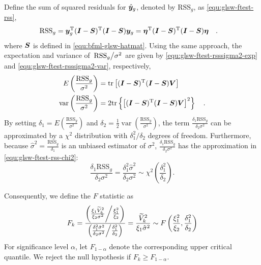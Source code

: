 \documentclass[times]{interact}
\theoremstyle{plain}%
\theoremstyle{definition}
\theoremstyle{remark}
\begin{document}
Define the sum of squared residuals for $\hat{\bm{y}}_g$, denoted by $\mathrm{RSS}_g$, as \autoref{equ:glsw-ftest-rss},
\begin{equation}\label{equ:glsw-ftest-rss}
    \begin{split}
    \mathrm{RSS}_{g} & = \bm{y}_{g}^{\mathrm{T}}(\bm{I}-\bm{S})^{\mathrm{T}}(\bm{I}-\bm{S})\bm{y}_{g} = \bm{\eta}^{\mathrm{T}}(\bm{I}-\bm{S})^{\mathrm{T}}(\bm{I}-\bm{S})\bm{\eta} \quad .
    \end{split}
\end{equation}
where $\bm{S}$ is defined in \autoref{equ:bfml-glsw-hatmat}.
Using the same approach, the expectation and variance of $\left.\mathrm{RSS}_g\middle/\sigma^2\right.$ are given by \autoref{equ:glsw-ftest-rsssigma2-exp} and \autoref{equ:glsw-ftest-rsssigma2-var}, respectively,
\begin{align}
\label{equ:glsw-ftest-rsssigma2-exp}
E\left( \frac{\mathrm{RSS}_{g}}{\sigma^{2}} \right) & = \mathrm{tr}\left[ (\bm{I}-\bm{S})^{\mathrm{T}}(\bm{I}-\bm{S})\bm{V} \right]  \\
\label{equ:glsw-ftest-rsssigma2-var}
\mathop{\mathrm{var}}\left( \frac{\mathrm{RSS}_{g}}{\sigma^{2}} \right) & = 2\mathrm{tr}\left\{ \left[ (\bm{I}-\bm{S})^{\mathrm{T}}(\bm{I}-\bm{S})\bm{V} \right]^2 \right\} \quad .
\end{align}
By setting $\delta_{1}=E\left( \frac{\mathrm{RSS}_{g}}{\sigma^{2}} \right)$ and 
$\delta_{2}=\frac{1}{2}\mathop{\mathrm{var}}\left( \frac{\mathrm{RSS}_{g}}{\sigma^{2}} \right)$,
the term $\frac{\delta_1\mathrm{RSS}_g}{\delta_2\sigma^2}$ can be approximated by a $\chi^2$ distribution with $\delta_1^2/\delta_2$ degrees of freedom.
Furthermore, because $\hat{\sigma}^2 = \frac{\mathrm{RSS}_g}{\delta_1}$
is an unbiased estimator of $\sigma^2$, $\frac{\delta_1\mathrm{RSS}_g}{\delta_2\sigma^2}$ has the approximation in \autoref{equ:glsw-ftest-rss-chi2}:
\begin{equation}\label{equ:glsw-ftest-rss-chi2}
    \frac{\delta_1\mathrm{RSS}_g}{\delta_2\sigma^2} = \frac{\delta_1^2 \hat{\sigma}^2}{\delta_2\sigma^2} \sim \chi^2\left(\frac{\delta_1^2}{\delta_2}\right).
\end{equation}

Consequently, we define the $F$ statistic as
\begin{equation}\label{equ:glsw-ftest-statistics}
F_k = \frac{
\left( \frac{\xi_{1}\widetilde V_{k}^{2}}{\xi_{2}\sigma^{2}} \middle/ \frac{\xi_{1}^{2}}{\xi_{2}} \right)
}{
\left( \frac{\delta_{1}^{2}\hat{\sigma}^{2}}{\delta_{2}\sigma^{2}} \middle/ \frac{\delta_{1}^{2}}{\delta_{2}} \right) 
} = \frac{\widetilde V_{k}^{2}}{\xi_{1}\hat{\sigma}^{2}} \sim F\left( \frac{\xi_{1}^{2}}{\xi_{2}} , \frac{\delta_{1}^{2}}{\delta_{2}} \right)
\end{equation}
For significance level $\alpha$, let $F_{1-\alpha}$ denote the corresponding upper critical quantile.
We reject the null hypothesis if $F_k \geqslant F_{1-\alpha}$.
\end{document}
